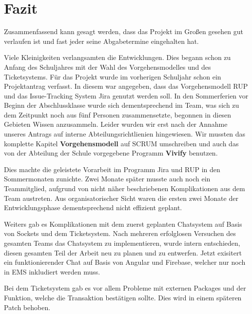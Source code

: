 \chapter{Fazit}

Zusammenfassend kann gesagt werden, dass das Projekt im Großen gesehen gut verlaufen ist und fast jeder seine Abgabetermine eingehalten hat.

Viele Kleinigkeiten verlangsamten die Entwicklungen. Dies begann schon zu Anfang des Schuljahres mit der Wahl des Vorgehensmodelles und des Ticketsystems.
Für das Projekt wurde im vorherigen Schuljahr schon ein Projektantrag verfasst. In diesem war angegeben, dass das Vorgehensmodell RUP und das Issue-Tracking
System Jira genutzt werden soll. In den Sommerferien vor Beginn der Abschlussklasse wurde sich dementsprechend im Team, was sich zu dem Zeitpunkt noch
aus fünf Personen zusammensetzte, begonnen in diesen Gebieten Wissen anzusammeln. Leider wurden wir erst nach der Annahme unseres Antrags auf interne Abteilungsrichtlienien
hingewiesen. Wir mussten das komplette Kapitel \textbf{Vorgehensmodell} auf SCRUM umschreiben und auch das von der Abteilung der Schule vorgegebene Programm \textbf{Vivify} benutzen.

Dies machte die geleistete Vorarbeit im Programm Jira und RUP in den Sommermonaten zunichte. Zwei Monate später musste auch noch ein Teammitglied, aufgrund von nicht näher beschriebenen
Komplikationen aus dem Team austreten.
Aus organisatorischer Sicht waren die ersten zwei Monate der Entwicklungsphase dementsprechend nicht effizient geplant.

Weiters gab es Komplikationen mit dem zuerst geplanten Chatsystem auf Basis von Sockets und dem Ticketsystem.
Nach mehreren erfolglosen Versuchen des gesamten Teams das Chatsystem zu implementieren, wurde intern entschieden, diesen gesamten Teil der Arbeit neu zu planen und zu entwerfen.
Jetzt exisitert ein funktionierender Chat auf Basis von Angular und Firebase, welcher nur noch
in EMS inkludiert werden muss.

Bei dem Ticketsystem gab es vor allem Probleme mit externen Packages und der Funktion, welche die Transaktion bestätigen sollte. Dies wird in einem späteren Patch behoben. 

